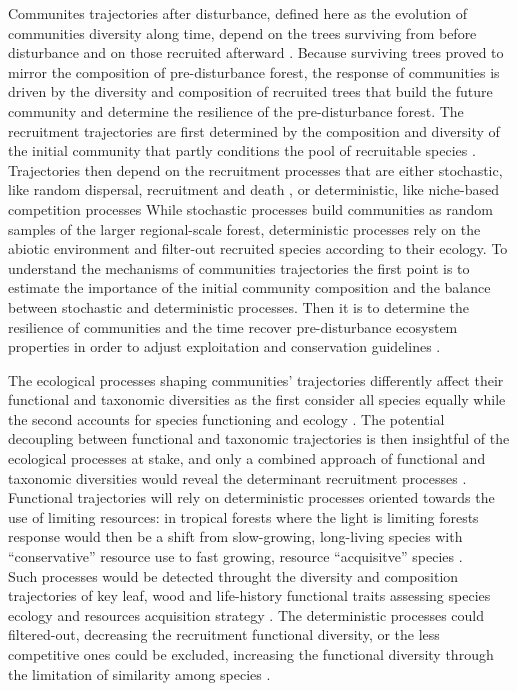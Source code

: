 \documentclass[fleqn,10pt]{ArtEcoFoG} %
\begin{document}
Communites trajectories after disturbance, defined here as the evolution
of communities diversity along time, depend on the trees surviving from
before disturbance and on those recruited afterward \citep{Herault2018}.
Because surviving trees proved to mirror the composition of
pre-disturbance forest, the response of communities is driven by the
diversity and composition of recruited trees that build the future
community and determine the resilience of the pre-disturbance forest.
The recruitment trajectories are first determined by the composition and
diversity of the initial community that partly conditions the pool of
recruitable species \citep{Herault2018}. Trajectories then depend on the
recruitment processes that are either stochastic, like random dispersal,
recruitment and death \citep{Hubbell2001}, or deterministic, like
niche-based competition processes \citep{Adler2007} While stochastic
processes build communities as random samples of the larger
regional-scale forest, deterministic processes rely on the abiotic
environment and filter-out recruited species according to their ecology.
To understand the mechanisms of communities trajectories the first point
is to estimate the importance of the initial community composition and
the balance between stochastic and deterministic processes. Then it is
to determine the resilience of communities and the time recover
pre-disturbance ecosystem properties in order to adjust exploitation and
conservation guidelines \citep{Diaz2005, Gardner2007, Schwartz2017}.

The ecological processes shaping communities' trajectories differently
affect their functional and taxonomic diversities as the first consider
all species equally while the second accounts for species functioning
and ecology \citep{Violle2007b, Kunstler2016}. The potential decoupling
between functional and taxonomic trajectories is then insightful of the
ecological processes at stake, and only a combined approach of
functional and taxonomic diversities would reveal the determinant
recruitment processes \citep{Fukami2005}. Functional trajectories will
rely on deterministic processes oriented towards the use of limiting
resources: in tropical forests where the light is limiting forests
response would then be a shift from slow-growing, long-living species
with ``conservative'' resource use to fast growing, resource
``acquisitve'' species \citep{Denslow1980, Molino2001, Bongers2009}.\\
Such processes would be detected throught the diversity and composition
trajectories of key leaf, wood and life-history functional traits
assessing species ecology and resources acquisition strategy
\citep{Wright2004, Chave2009b, Herault2011}. The deterministic processes
could filtered-out, decreasing the recruitment functional diversity, or
the less competitive ones could be excluded, increasing the functional
diversity through the limitation of similarity among species
\citep{Ackerly2003, McGill2006}.
\end{document}
